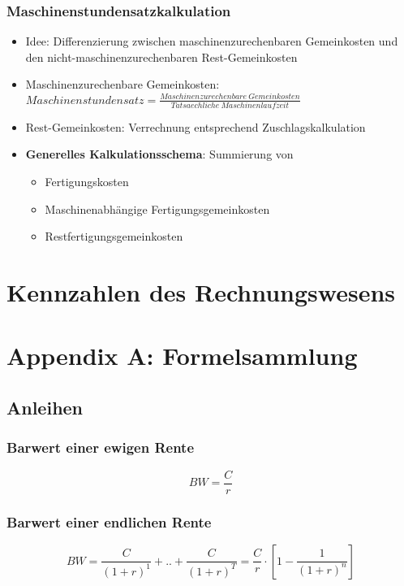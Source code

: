 \subsubsection{Maschinenstundensatzkalkulation}
\begin{itemize}
	\item Idee: Differenzierung zwischen maschinenzurechenbaren Gemeinkosten und den nicht-maschinenzurechenbaren Rest-Gemeinkosten
	\item Maschinenzurechenbare Gemeinkosten:\newline \(Maschinenstundensatz = \frac{Maschinenzurechenbare~Gemeinkosten}{Tatsaechliche~Maschinenlaufzeit}\)
	\item Rest-Gemeinkosten: Verrechnung entsprechend Zuschlagskalkulation
	\item \textbf{Generelles Kalkulationsschema}: Summierung von
	\begin{itemize}
		\item Fertigungskosten
		\item Maschinenabhängige Fertigungsgemeinkosten
		\item Restfertigungsgemeinkosten
	\end{itemize}
\end{itemize}



\section{Kennzahlen des Rechnungswesens}



\section{Appendix A: Formelsammlung}

\subsection{Anleihen}

\subsubsection{Barwert einer ewigen Rente}
\[BW = \frac{C}{r}\]

\subsubsection{Barwert einer endlichen Rente}
\[BW = \frac{C}{(1+r)^1}+..+\frac{C}{(1+r)^T} = \frac{C}{r}\cdot[1-\frac{1}{(1+r)^n}]\]

